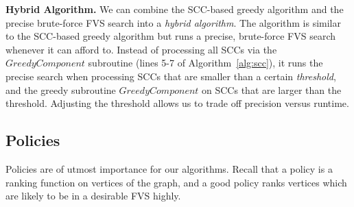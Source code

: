 {\bf Hybrid Algorithm.}
We can combine the SCC-based greedy algorithm and the precise brute-force FVS search into a \emph{hybrid algorithm}. The algorithm is similar to the SCC-based greedy algorithm but runs a precise, brute-force FVS search whenever it can afford to. Instead of processing all SCCs via the $GreedyComponent$ subroutine (lines 5-7 of Algorithm~\ref{alg:scc}), it runs the precise search when processing SCCs that are smaller than a certain \emph{threshold}, and the greedy subroutine $GreedyComponent$ on SCCs that are larger than the threshold. Adjusting the threshold allows us to trade off precision versus runtime.

\subsection{Policies}
\label{subsec:validator_reordering:policy}
Policies are of utmost importance for our algorithms. Recall that a policy is a ranking function on vertices of the graph, and a good policy ranks vertices which are likely to be in a desirable FVS highly. 

